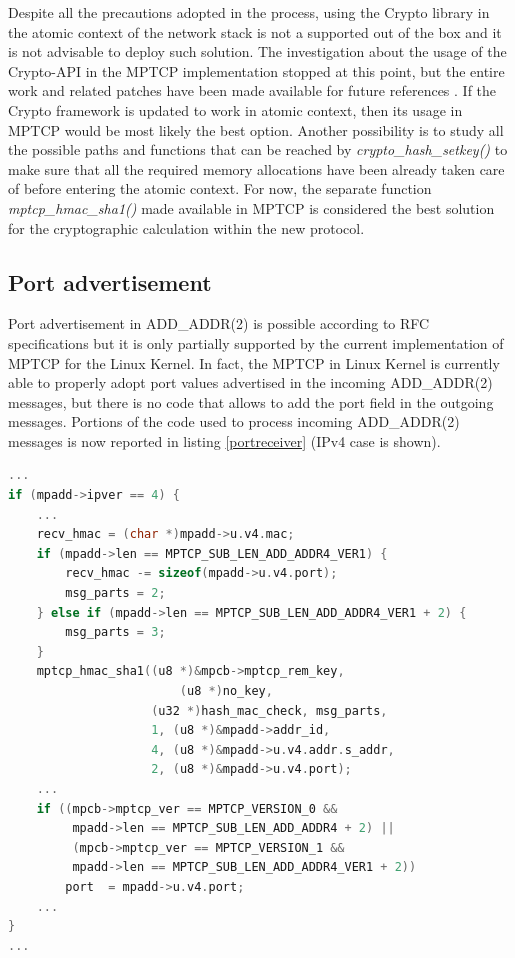 Despite all the precautions adopted in the process, using the Crypto library in the atomic context of the network stack is not a supported out of the box and it is not advisable to deploy such solution. The investigation about the usage of the Crypto-API in the MPTCP implementation stopped at this point, but the entire work and related patches have been made available for future references \cite{cryptopatch1} \cite{cryptopatch2}. If the Crypto framework is updated to work in atomic context, then its usage in MPTCP would be most likely the best option. Another possibility is to study all the possible paths and functions that can be reached by \textit{crypto\_hash\_setkey()} to make sure that all the required memory allocations have been already taken care of before entering the atomic context. For now, the separate function \textit{mptcp\_hmac\_sha1()} made available in MPTCP is considered the best solution for the cryptographic calculation within the new protocol.

\subsection{Port advertisement}
\label{portad}
Port advertisement in ADD\_ADDR(2) is possible according to RFC specifications but it is only partially supported by the current implementation of MPTCP for the Linux Kernel. In fact, the MPTCP in Linux Kernel is currently able to properly adopt port values advertised in the incoming ADD\_ADDR(2) messages, but there is no code that allows to add the port field in the outgoing messages.
Portions of the code used to process incoming ADD\_ADDR(2) messages is now reported in listing \ref{portreceiver} (IPv4 case is shown).

\begin{lstlisting}[language=c, caption=Handling port field in ADD\_ADDR2 at the receiver, label=portreceiver]
...
if (mpadd->ipver == 4) {
    ...
	recv_hmac = (char *)mpadd->u.v4.mac;
	if (mpadd->len == MPTCP_SUB_LEN_ADD_ADDR4_VER1) {
		recv_hmac -= sizeof(mpadd->u.v4.port);
		msg_parts = 2;
	} else if (mpadd->len == MPTCP_SUB_LEN_ADD_ADDR4_VER1 + 2) {
		msg_parts = 3;
	}
	mptcp_hmac_sha1((u8 *)&mpcb->mptcp_rem_key,
	        			(u8 *)no_key,
			      	(u32 *)hash_mac_check, msg_parts,
				    1, (u8 *)&mpadd->addr_id,
				    4, (u8 *)&mpadd->u.v4.addr.s_addr,
				    2, (u8 *)&mpadd->u.v4.port);
	...
	if ((mpcb->mptcp_ver == MPTCP_VERSION_0 &&
	     mpadd->len == MPTCP_SUB_LEN_ADD_ADDR4 + 2) ||
	     (mpcb->mptcp_ver == MPTCP_VERSION_1 &&
	     mpadd->len == MPTCP_SUB_LEN_ADD_ADDR4_VER1 + 2))
		port  = mpadd->u.v4.port;
	...	
}
...
\end{lstlisting}

